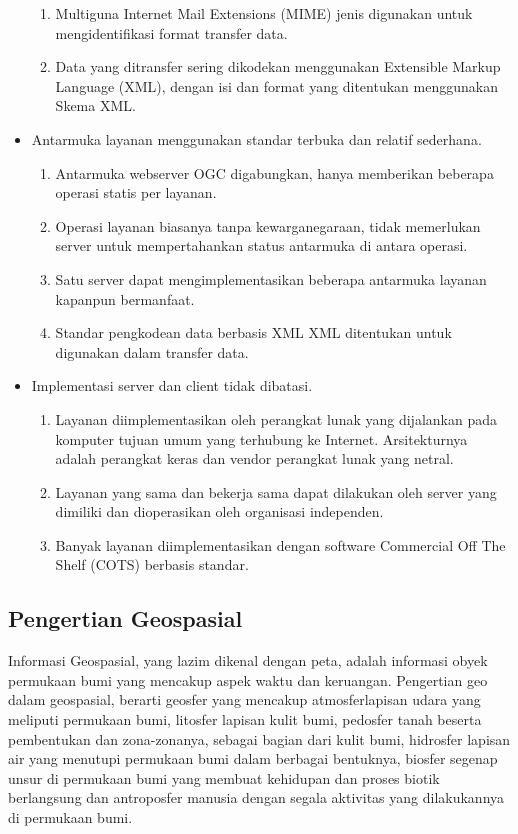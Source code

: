 \begin{itemize}
\begin{enumerate}
\item Multiguna Internet Mail Extensions (MIME) jenis digunakan untuk mengidentifikasi format transfer data.
\item Data yang ditransfer sering dikodekan menggunakan Extensible Markup Language (XML), dengan isi dan format yang ditentukan menggunakan Skema XML.
\end{enumerate}
\item Antarmuka layanan menggunakan standar terbuka dan relatif sederhana.
\begin{enumerate}
\item Antarmuka webserver OGC digabungkan, hanya memberikan beberapa operasi statis per layanan.
\item Operasi layanan biasanya tanpa kewarganegaraan, tidak memerlukan server untuk mempertahankan status antarmuka di antara operasi.
\item Satu server dapat mengimplementasikan beberapa antarmuka layanan kapanpun bermanfaat.
\item Standar pengkodean data berbasis XML XML ditentukan untuk digunakan dalam transfer data.
\end{enumerate}
\item Implementasi server dan client tidak dibatasi.
\begin{enumerate}
\item Layanan diimplementasikan oleh perangkat lunak yang dijalankan pada komputer tujuan umum yang terhubung ke Internet. Arsitekturnya adalah perangkat keras dan vendor perangkat lunak yang netral.
\item Layanan yang sama dan bekerja sama dapat dilakukan oleh server yang dimiliki dan dioperasikan oleh organisasi independen. 
\item Banyak layanan diimplementasikan dengan software Commercial Off The Shelf (COTS) berbasis standar. \cite{lupp2008open}
\end{enumerate}
\end{itemize}
\subsection{Pengertian Geospasial} Informasi Geospasial, yang lazim dikenal dengan peta, adalah informasi
obyek permukaan bumi yang mencakup aspek waktu dan keruangan. Pengertian
geo dalam geospasial, berarti geosfer yang mencakup atmosferlapisan udara
yang meliputi permukaan bumi, litosfer lapisan kulit bumi, pedosfer tanah
beserta pembentukan dan zona-zonanya, sebagai bagian dari kulit bumi,
hidrosfer lapisan air yang menutupi permukaan bumi dalam berbagai bentuknya,
biosfer segenap unsur di permukaan bumi yang membuat kehidupan dan proses
biotik berlangsung dan antroposfer manusia dengan segala aktivitas yang
dilakukannya di permukaan bumi.

